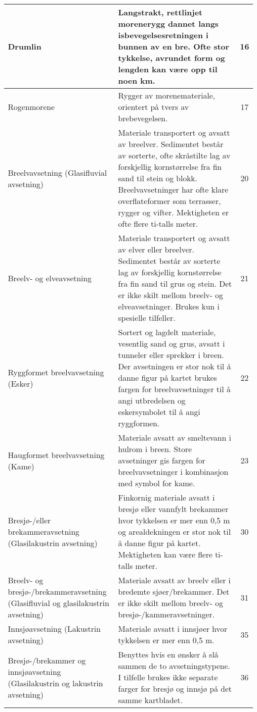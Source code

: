 \begin{longtable}{|p{3.5cm}|p{6.2cm}|c|}
    Drumlin & Langstrakt, rettlinjet morenerygg dannet langs isbevegelsesretningen i bunnen av en bre. Ofte stor tykkelse, avrundet form og lengden kan være opp til noen km. & 16 \\ \hline
    Rogenmorene & Rygger av morenemateriale, orientert på tvers av brebevegelsen. & 17 \\ \hline
    Breelvavsetning (Glasifluvial avsetning) & Materiale transportert og avsatt av breelver. Sedimentet består av sorterte, ofte skråstilte lag av forskjellig kornstørrelse fra fin sand til stein og blokk. Breelvavsetninger har ofte klare overflateformer som terrasser, rygger og vifter. Mektigheten er ofte flere ti-talls meter. & 20 \\ \hline
    Breelv- og elveavsetning & Materiale transportert og avsatt av elver eller breelver. Sedimentet består av sorterte lag av forskjellig kornstørrelse fra fin sand til grus og stein. Det er ikke skilt mellom breelv- og elveavsetninger. Brukes kun i spesielle tilfeller. & 21 \\ \hline
    Ryggformet breelvavsetning (Esker) & Sortert og lagdelt materiale, vesentlig sand og grus, avsatt i tunneler eller sprekker i breen. Der avsetningen er stor nok til å danne figur på kartet brukes fargen for breelvavsetninger til å angi utbredelsen og eskersymbolet til å angi ryggformen. & 22 \\ \hline
    Haugformet breelvavsetning (Kame) & Materiale avsatt av smeltevann i hulrom i breen. Store avsetninger gis fargen for breelvavsetninger i kombinasjon med symbol for kame. & 23 \\ \hline
    Bresjø-/eller brekammeravsetning (Glasilakustrin avsetning) & Finkornig materiale avsatt i bresjø eller vannfylt brekammer hvor tykkelsen er mer enn 0,5 m og arealdekningen er stor nok til å danne figur på kartet. Mektigheten kan være flere ti-talls meter. & 30 \\ \hline
    Breelv- og bresjø-/brekammeravsetning (Glasifluvial og glasilakustrin avsetning) & Materiale avsatt av breelv eller i bredemte sjøer/brekammer. Det er ikke skilt mellom breelv- og bresjø-/kammeravsetninger. & 31 \\ \hline
    Innsjøavsetning (Lakustrin avsetning) & Materiale avsatt i innsjøer hvor tykkelsen er mer enn 0,5 m. & 35 \\ \hline
    Bresjø-/brekammer og innsjøavsetning (Glasilakustrin og lakustrin avsetning) & Benyttes hvis en ønsker å slå sammen de to avsetningstypene. I tilfelle brukes ikke separate farger for bresjø og innsjø på det samme kartbladet. & 36 \\ \hline

\end{longtable}
